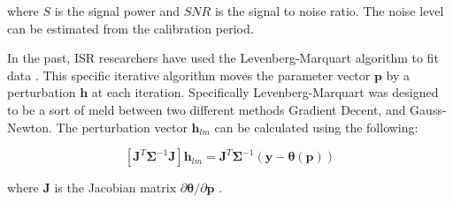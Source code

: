 \noindent where $S$ is the signal power and $SNR$ is the signal to noise ratio. The noise level can be estimated from the calibration period. 

In the past, ISR researchers have used the Levenberg-Marquart algorithm to fit data \cite{nikoukar2008}. This specific iterative algorithm moves the parameter vector $\mathbf{p}$ by a perturbation $\mathbf{h}$ at each iteration\cite{gavin:2013}. Specifically Levenberg-Marquart was designed to be a sort of meld between two different methods Gradient Decent, and Gauss-Newton. The perturbation vector $\mathbf{h}_{lm}$ can be calculated using the following:

\begin{equation}
\left[ \mathbf{J}^T\bm{\Sigma}^{-1}\mathbf{J}\right]\mathbf{h}_{lm} =\mathbf{J}^T\bm{\Sigma}^{-1}(\mathbf{y}-\bm{\theta}(\mathbf{p}))
\label{hlm}
\end{equation}

\noindent where $\mathbf{J}$ is the Jacobian matrix $\partial \bm{\theta}/\partial \mathbf{p}$ \cite{levenberg1944,marquardt:1963}. 

%



